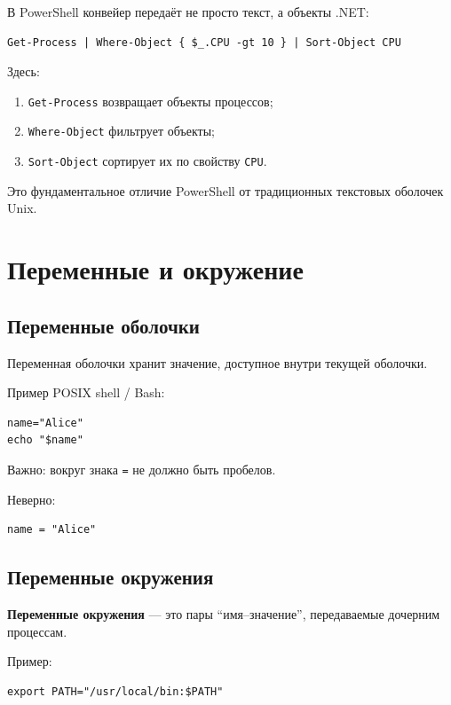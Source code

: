 \documentclass[12pt,a4paper]{article}
\begin{document}
В PowerShell конвейер передаёт не просто текст, а объекты .NET:

\begin{lstlisting}
Get-Process | Where-Object { $_.CPU -gt 10 } | Sort-Object CPU
\end{lstlisting}

Здесь:
\begin{enumerate}
    \item \texttt{Get-Process} возвращает объекты процессов;
    \item \texttt{Where-Object} фильтрует объекты;
    \item \texttt{Sort-Object} сортирует их по свойству \texttt{CPU}.
\end{enumerate}

Это фундаментальное отличие PowerShell от традиционных текстовых оболочек Unix.

\section{Переменные и окружение}

\subsection{Переменные оболочки}

Переменная оболочки хранит значение, доступное внутри текущей оболочки.

Пример POSIX shell / Bash:

\begin{lstlisting}
name="Alice"
echo "$name"
\end{lstlisting}

Важно: вокруг знака \texttt{=} не должно быть пробелов.

Неверно:

\begin{lstlisting}
name = "Alice"
\end{lstlisting}

\subsection{Переменные окружения}

\textbf{Переменные окружения} --- это пары ``имя--значение'', передаваемые дочерним процессам.

Пример:

\begin{lstlisting}
export PATH="/usr/local/bin:$PATH"
\end{lstlisting}
\end{document}
